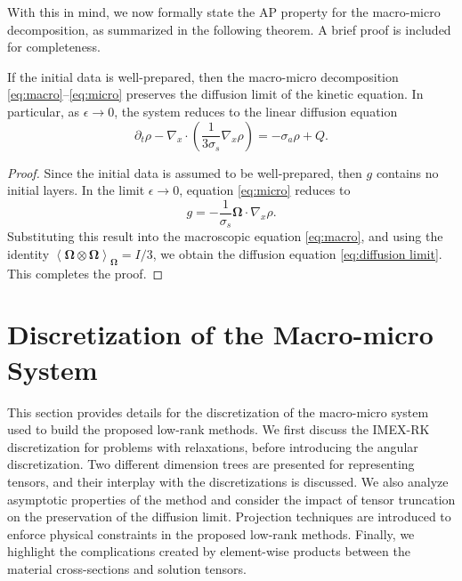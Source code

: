 \documentclass[onefignum,onetabnum]{siamart220329}
\begin{document}
With this in mind, we now formally state the AP property for the macro-micro decomposition, as summarized in the following theorem. A brief proof is included for completeness.
\begin{theorem}
    \label{thm:MM AP property}
    If the initial data is well-prepared, then the macro-micro decomposition \eqref{eq:macro}--\eqref{eq:micro} preserves the diffusion limit of the kinetic equation. In particular, as $\epsilon \to 0$, the system reduces to the linear diffusion equation
    \begin{equation}
        \label{eq:diffusion limit}
        \partial_t \rho - \nabla_x \cdot \left( \frac{1}{3 \sigma_s} \nabla_x \rho \right) = - \sigma_a \rho + Q.
    \end{equation}
\end{theorem}
\begin{proof}
    Since the initial data is assumed to be well-prepared, then $g$ contains no initial layers. In the limit $\epsilon \rightarrow 0$, equation \eqref{eq:micro} reduces to
    \begin{equation*}
    g = - \frac{1}{\sigma_{s}} \mathbf{\Omega} \cdot \nabla_{x} \rho.
    \end{equation*}
    Substituting this result into the macroscopic equation \eqref{eq:macro}, and using the identity $\left\langle  \mathbf{\Omega} \otimes \mathbf{\Omega} \right\rangle_{\mathbf{\Omega}} = I/3$, we obtain the diffusion equation \eqref{eq:diffusion limit}. This completes the proof.
\end{proof}



\section{Discretization of the Macro-micro System}
\label{sec:discretization main}

This section provides details for the discretization of the macro-micro system used to build the proposed low-rank methods. We first discuss the IMEX-RK discretization for problems with relaxations, before introducing the angular discretization. Two different dimension trees are presented for representing tensors, and their interplay with the discretizations is discussed. We also analyze asymptotic properties of the method and consider the impact of tensor truncation on the preservation of the diffusion limit. Projection techniques are introduced to enforce physical constraints in the proposed low-rank methods. Finally, we highlight the complications created by element-wise products between the material cross-sections and solution tensors. 
\end{document}
